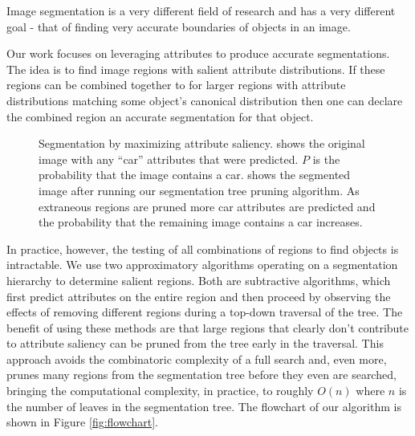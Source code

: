 \documentclass[10pt,twocolumn,letterpaper]{article}
\begin{document}
Image segmentation is a very different field of research and has a very different
goal - that of finding very accurate boundaries of objects in an image.

Our work focuses on leveraging attributes to produce accurate segmentations.
The idea is to find image regions with salient attribute distributions.  If
these regions can be combined together to for larger regions with attribute
distributions matching some object's canonical distribution then one can
declare the combined region an accurate segmentation for that object.

\begin{figure}
\centering
{}
\caption{Segmentation by maximizing attribute saliency.   shows
the original image with any ``car'' attributes that were predicted.  $P$ is the probability
that the image contains a car.   shows the segmented image after
running our segmentation tree pruning algorithm.  As extraneous regions are pruned
more car attributes are predicted and the probability that the remaining image
contains a car increases.}
\label{fig:truck}
\end{figure}

In practice, however, the testing of all combinations of regions to
find objects is intractable.  We use two approximatory algorithms
operating on a segmentation hierarchy to determine salient regions.
Both are subtractive algorithms, which first predict attributes on
the entire region and then proceed by observing the effects of
removing different regions during a top-down traversal of the tree.
The benefit of using these methods are that large regions that
clearly don't contribute to attribute saliency can be pruned from
the tree early in the traversal.  This approach avoids the
combinatoric complexity of a full search and, even more, prunes many
regions from the segmentation tree before they even are searched,
bringing the computational complexity, in practice, to roughly
$O(n)$ where $n$ is the number of leaves in the segmentation tree.
The flowchart of our algorithm is shown in Figure
\ref{fig:flowchart}.
\end{document}

